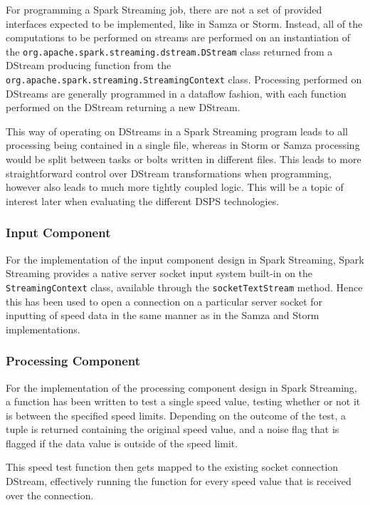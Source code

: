 For programming a Spark Streaming job, there are not a set of provided interfaces expected to be implemented, like in
Samza or Storm. Instead, all of the computations to be performed on streams are performed on an instantiation of the
\texttt{org.apache.spark.streaming.dstream.DStream} class returned from a DStream producing function from the
\texttt{org.apache.spark.streaming.StreamingContext} class. Processing performed on DStreams are generally programmed in
a dataflow fashion, with each function performed on the DStream returning a new DStream.

This way of operating on DStreams in a Spark Streaming program leads to all processing being contained in a single file,
whereas in Storm or Samza processing would be split between tasks or bolts written in different files. This leads to
more straightforward control over DStream transformations when programming, however also leads to much more tightly
coupled logic. This will be a topic of interest later when evaluating the different DSPS technologies.

\subsubsection{Input Component}

For the implementation of the input component design in Spark Streaming, Spark Streaming provides a native server socket input
system built-in on the \texttt{StreamingContext} class, available through the \texttt{socketTextStream} method. Hence
this has been used to open a connection on a particular server socket for inputting of speed data in the same manner as in the
Samza and Storm implementations.

\subsubsection{Processing Component}

For the implementation of the processing component design in Spark Streaming, a function has been written to test a single
speed value, testing whether or not it is between the specified speed limits. Depending on the outcome of the test,
a tuple is returned containing the original speed value, and a noise flag that is flagged if the data value is outside
of the speed limit.

This speed test function then gets mapped to the existing socket connection DStream, effectively running the function
for every speed value that is received over the connection.

